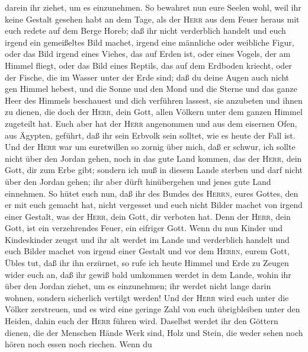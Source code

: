 darein ihr ziehet, um es einzunehmen.  So bewahret nun
eure Seelen wohl, weil ihr keine Gestalt gesehen habt an dem Tage, als
der \textsc{Herr} aus dem Feuer heraus mit euch redete auf dem Berge
Horeb;  daß ihr nicht verderblich handelt und euch irgend
ein gemeißeltes Bild machet, irgend eine männliche oder weibliche Figur,
 oder das Bild irgend eines Viehes, das auf Erden ist,
oder eines Vogels, der am Himmel fliegt,  oder das Bild
eines Reptils, das auf dem Erdboden kriecht, oder der Fische, die im
Wasser unter der Erde sind;  daß du deine Augen auch
nicht gen Himmel hebest, und die Sonne und den Mond und die Sterne und
das ganze Heer des Himmels beschauest und dich verführen lassest, sie
anzubeten und ihnen zu dienen, die doch der \textsc{Herr}, dein Gott,
allen Völkern unter dem ganzen Himmel zugeteilt hat. 
Euch aber hat der \textsc{Herr} angenommen und aus dem eisernen Ofen,
aus Ägypten, geführt, daß ihr sein Erbvolk sein solltet, wie es heute
der Fall ist.  Und der \textsc{Herr} war um euretwillen
so zornig über mich, daß er schwur, ich sollte nicht über den Jordan
gehen, noch in das gute Land kommen, das der \textsc{Herr}, dein Gott,
dir zum Erbe gibt;  sondern ich muß in diesem Lande
sterben und darf nicht über den Jordan gehen; ihr aber dürft
hinübergehen und jenes gute Land einnehmen.  So hütet
euch nun, daß ihr des Bundes des \textsc{Herrn}, eures Gottes, den er
mit euch gemacht hat, nicht vergesset und euch nicht Bilder machet von
irgend einer Gestalt, was der \textsc{Herr}, dein Gott, dir verboten
hat.  Denn der \textsc{Herr}, dein Gott, ist ein
verzehrendes Feuer, ein eifriger Gott.  Wenn du nun
Kinder und Kindeskinder zeugst und ihr alt werdet im Lande und
verderblich handelt und euch Bilder machet von irgend einer Gestalt und
vor dem \textsc{Herrn}, eurem Gott, Übles tut, daß ihr ihn erzürnet,
 so rufe ich heute Himmel und Erde zu Zeugen wider euch
an, daß ihr gewiß bald umkommen werdet in dem Lande, wohin ihr über den
Jordan ziehet, um es einzunehmen; ihr werdet nicht lange darin wohnen,
sondern sicherlich vertilgt werden!  Und der
\textsc{Herr} wird euch unter die Völker zerstreuen, und es wird eine
geringe Zahl von euch übrigbleiben unter den Heiden, dahin euch der
\textsc{Herr} führen wird.  Daselbst werdet ihr den
Göttern dienen, die der Menschen Hände Werk sind, Holz und Stein, die
weder sehen noch hören noch essen noch riechen.  Wenn du
